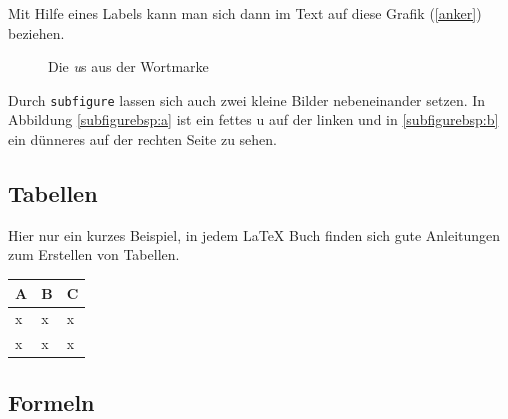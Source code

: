 Mit Hilfe eines Labels kann man sich dann im Text auf diese Grafik (\ref{anker}) beziehen. 

\begin{figure}[ht]
    \centering
    \hspace{1cm}
    \caption{Die \emph{u}s aus der Wortmarke}
\end{figure}

Durch \verb|subfigure| lassen sich auch zwei kleine Bilder nebeneinander setzen. In Abbildung \ref{subfigurebsp:a} ist ein fettes u auf der linken und in \ref{subfigurebsp:b} ein dünneres auf der rechten Seite zu sehen.


\subsection{Tabellen}

Hier nur ein kurzes Beispiel, in jedem \LaTeX{} Buch finden sich gute Anleitungen zum Erstellen von Tabellen.

\begin{table}[h]
    \centering
    \begin{tabular}{|l|l|l|}
        A & B & C \\
        \hline
        x & x & x \\
        x & x & x
    \end{tabular}
\end{table}


\subsection{Formeln}

